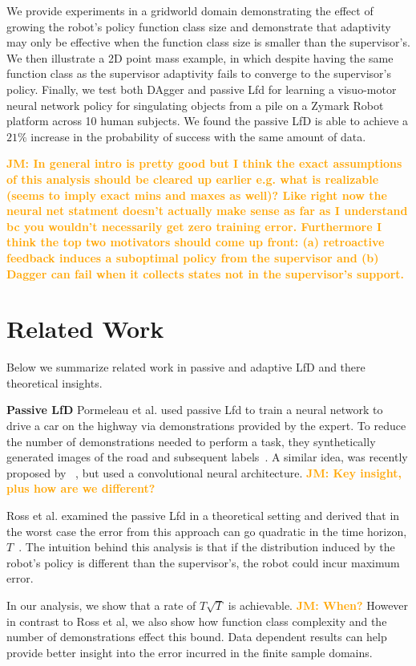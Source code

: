 \documentclass[10pt, conference]{ieeeconf}      %
\newcommand{\jmnote}[1]{%
 {\textcolor{orange}{\textbf{JM: #1}}}{}}
\begin{document}
We  provide experiments in a gridworld domain demonstrating the effect of growing the robot's policy function class size and demonstrate that adaptivity may only be effective when the function class size is smaller than the supervisor's. We then illustrate a 2D point mass example, in which despite having the same function class as the supervisor adaptivity fails to converge to the supervisor's policy. Finally, we test both DAgger and passive Lfd for learning a visuo-motor neural network policy for singulating objects from a pile on a Zymark Robot platform across 10 human subjects. We found the passive LfD is able to achieve a $21 \%$ increase in the probability of success with the same amount of data.

\jmnote{In general intro is pretty good but I think the exact assumptions of this analysis should be cleared up earlier e.g. what is realizable (seems to imply exact mins and maxes as well)? Like right now the neural net statment doesn't actually make sense as far as I understand bc you wouldn't necessarily get zero training error. Furthermore I think the top two motivators should come up front: (a) retroactive feedback induces a suboptimal policy from the supervisor and (b) Dagger can fail when it collects states not in the supervisor's support.}

\section{Related Work}
Below we summarize related work in passive and adaptive LfD and there theoretical insights. 

\noindent \textbf {Passive LfD}
Pormeleau et al. used passive Lfd to train a neural network to drive a car on the highway via demonstrations provided by the expert. To reduce the number of demonstrations needed to perform a task, they synthetically generated  images of the road and subsequent labels~\cite{pomerleau1989alvinn}. A similar idea, was recently proposed by ~\cite{NVIDEA}, but used a convolutional neural architecture. 
\jmnote{Key insight, plus how are we different?}

Ross et al. examined the passive Lfd in a theoretical setting and derived that in the worst case the error from this approach can go quadratic in the time  horizon, $T$~\cite{ross2010efficient}. The intuition behind this analysis is that if the distribution induced by the robot's policy is different than the supervisor's, the robot could incur maximum error. 

In our analysis, we show that a rate of $T\sqrt{T}$ is achievable. \jmnote{When?}
However in contrast to Ross et al,  we also show how function class complexity and the number of demonstrations effect this bound. Data dependent results can help provide better insight into the error incurred in the finite sample domains. 
\end{document}
